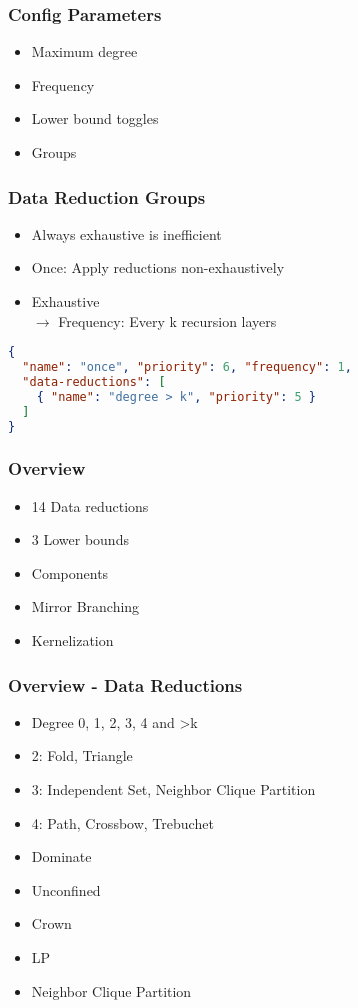\documentclass[usenames,dvipsnames]{beamer}[12pt]
\begin{document}
	\begin{frame}
		\frametitle{Config Parameters}
		
		\begin{itemize}
			\item Maximum degree
			\item Frequency
			\item Lower bound toggles
			\item Groups
		\end{itemize}
	\end{frame}
	
	\begin{frame}[fragile]
		\frametitle{Data Reduction Groups}
		
		\begin{itemize}
			\item Always exhaustive is inefficient
			\item Once: Apply reductions non-exhaustively
			\item Exhaustive \\
			$\rightarrow$ Frequency: Every k recursion layers
		\end{itemize}
	
		\vspace{4mm}
	
		\begin{lstlisting}[language=json,firstnumber=1]
{
  "name": "once", "priority": 6, "frequency": 1,
  "data-reductions": [
    { "name": "degree > k", "priority": 5 }
  ]
}
		\end{lstlisting}
		
	\end{frame}

	\begin{frame}
		\frametitle{Overview}
		\begin{itemize}
			\item 14 Data reductions
			\item 3 Lower bounds
			\item Components
			\item Mirror Branching
			\item Kernelization
		\end{itemize}
	\end{frame}

	\begin{frame}
		\frametitle{Overview - Data Reductions}
		
		\begin{itemize}
			\item Degree 0, 1, 2, 3, 4 and >k
			\item 2: Fold, Triangle
			\item 3: Independent Set, Neighbor Clique Partition
			\item 4: Path, Crossbow, Trebuchet
			\item Dominate
			\item Unconfined
			\item Crown
			\item LP
			\item Neighbor Clique Partition
		\end{itemize}
	\end{frame}
\end{document}
